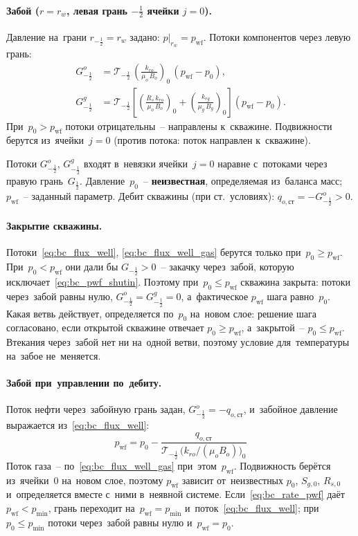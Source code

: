 \documentclass[12pt,a4paper]{article}
\newcommand{\half}{\tfrac{1}{2}}
\newcommand{\rw}{r_w}
\newcommand{\pwf}{p_{\mathrm{wf}}}
\begin{document}
\paragraph{Забой ($r = \rw$, левая грань $-\half$ ячейки $j = 0$).}
Давление на~грани $r_{-\half} = \rw$ задано: $p\big|_{r_w} = \pwf$.
Потоки компонентов через левую грань:
\begin{align}
  G_{-\half}^{o} &= \mathcal{T}_{-\half}\,
    \left(\frac{k_{ro}}{\mu_o\,B_o}\right)_{\!0}
    \,(\pwf - p_0),
    \label{eq:bc_flux_well} \\
  G_{-\half}^{g} &= \mathcal{T}_{-\half}\!\left[
    \left(\frac{R_s\,k_{ro}}{\mu_o\,B_o}\right)_{\!0}
    + \left(\frac{k_{rg}}{\mu_g\,B_g}\right)_{\!0}
    \right](\pwf - p_0).
    \label{eq:bc_flux_well_gas}
\end{align}
При~$p_0 > \pwf$ потоки отрицательны~-- направлены к~скважине.
Подвижности берутся из~ячейки~$j = 0$
(против потока: поток направлен к~скважине).

Потоки $G_{-\half}^{o}$, $G_{-\half}^{g}$ входят в~невязки
ячейки~$j = 0$ наравне с~потоками через правую грань~$G_{\half}$.
Давление~$p_0$~-- \textbf{неизвестная}, определяемая
из~баланса масс; $\pwf$~-- заданный параметр.
Дебит скважины (при ст.~условиях):
$q_{o,\text{ст}} = -G_{-\half}^o > 0$.

\paragraph{Закрытие скважины.}
Потоки~\eqref{eq:bc_flux_well}, \eqref{eq:bc_flux_well_gas}
берутся только при~$p_0 \ge \pwf$. При~$p_0 < \pwf$ они дали бы
$G_{-\half} > 0$~-- закачку через~забой, которую
исключает~\eqref{eq:bc_pwf_shutin}. Поэтому при~$p_0 \le \pwf$
скважина закрыта: потоки через~забой равны нулю,
$G_{-\half}^{o} = G_{-\half}^{g} = 0$, а~фактическое $\pwf$ шага
равно~$p_0$. Какая ветвь действует, определяется по~$p_0$
на~новом слое: решение шага согласовано, если открытой скважине
отвечает $p_0 \ge \pwf$, а~закрытой~-- $p_0 \le \pwf$.
Втекания через~забой нет ни на~одной ветви, поэтому условие
для~температуры на~забое не~меняется.

\paragraph{Забой при~управлении по~дебиту.}
Поток нефти через~забойную грань задан, $G_{-\half}^{o} = -q_{o,\text{ст}}$,
и~забойное давление выражается из~\eqref{eq:bc_flux_well}:
\begin{equation}\label{eq:bc_rate_pwf}
  \boxed{\;
  \pwf = p_0 - \frac{q_{o,\text{ст}}}
    {\mathcal{T}_{-\half}\,\bigl(k_{ro}/(\mu_o B_o)\bigr)_0}
  \;}
\end{equation}
Поток газа~-- по~\eqref{eq:bc_flux_well_gas} при~этом~$\pwf$.
Подвижность берётся из~ячейки~0 на~новом слое, поэтому $\pwf$
зависит от~неизвестных $p_0$, $S_{g,0}$, $R_{s,0}$ и~определяется
вместе с~ними в~неявной системе. Если~\eqref{eq:bc_rate_pwf}
даёт $\pwf < p_{\min}$, грань переходит на~$\pwf = p_{\min}$
и~поток~\eqref{eq:bc_flux_well}; при~$p_0 \le p_{\min}$ потоки
через~забой равны нулю и~$\pwf = p_0$.
\end{document}
